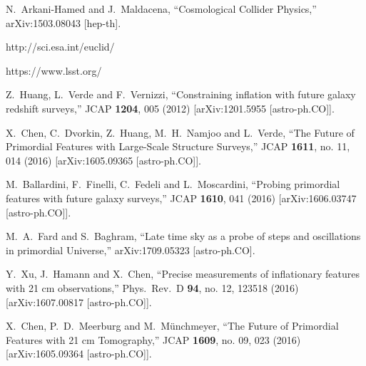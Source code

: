 \documentclass[12pt]{article}
\begin{document}
\begin{thebibliography}{99}
  N.~Arkani-Hamed and J.~Maldacena,
  ``Cosmological Collider Physics,''
  arXiv:1503.08043 [hep-th].

http://sci.esa.int/euclid/
   
https://www.lsst.org/



  Z.~Huang, L.~Verde and F.~Vernizzi,
  ``Constraining inflation with future galaxy redshift surveys,''
  JCAP {\bf 1204}, 005 (2012)
  [arXiv:1201.5955 [astro-ph.CO]].


  X.~Chen, C.~Dvorkin, Z.~Huang, M.~H.~Namjoo and L.~Verde,
  ``The Future of Primordial Features with Large-Scale Structure Surveys,''
  JCAP {\bf 1611}, no. 11, 014 (2016)
  [arXiv:1605.09365 [astro-ph.CO]].
  
  M.~Ballardini, F.~Finelli, C.~Fedeli and L.~Moscardini,
  ``Probing primordial features with future galaxy surveys,''
  JCAP {\bf 1610}, 041 (2016)
  [arXiv:1606.03747 [astro-ph.CO]].

  M.~A.~Fard and S.~Baghram,
  ``Late time sky as a probe of steps and oscillations in primordial Universe,''
  arXiv:1709.05323 [astro-ph.CO].

  Y.~Xu, J.~Hamann and X.~Chen,
  ``Precise measurements of inflationary features with 21 cm observations,''
  Phys.\ Rev.\ D {\bf 94}, no. 12, 123518 (2016)
  [arXiv:1607.00817 [astro-ph.CO]].

  X.~Chen, P.~D.~Meerburg and M.~Münchmeyer,
  ``The Future of Primordial Features with 21 cm Tomography,''
  JCAP {\bf 1609}, no. 09, 023 (2016)
  [arXiv:1605.09364 [astro-ph.CO]].
  

\end{thebibliography}
\end{document}
